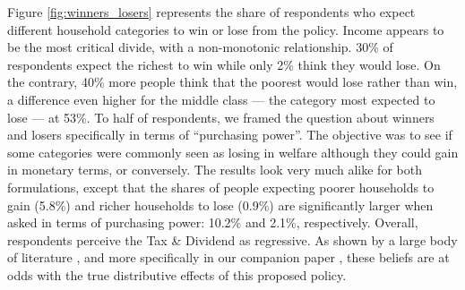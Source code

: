 \documentclass[english,5p,authoryear]{elsarticle}
\begin{document}
Figure \ref{fig:winners_losers} represents the share of respondents who expect different household categories to win or lose from the policy. Income appears to be the most critical divide, with a non-monotonic relationship. 30\% of respondents expect the richest to win while only 2\% think they would lose. On the contrary, 40\% more people think that the poorest would lose rather than win, a difference even higher for the middle class --- the category most expected to lose --- at 53\%. To half of respondents, we framed the question about winners and losers specifically in terms of ``purchasing power''. The objective was to see if some categories were commonly seen as losing in welfare although they could gain in monetary terms, or conversely. The results look very much alike for both formulations, except that the shares of people expecting poorer households to gain (5.8\%) and richer households to lose (0.9\%) are significantly larger when asked in terms of purchasing power: 10.2\% and 2.1\%, respectively. Overall, respondents perceive the Tax \& Dividend as regressive. As shown by a large body of literature \citep[e.g.][]{west_williams_04,bento_distributional_2009,williams_initial_2015}, and more specifically in our companion paper \citep{douenne_can_2019}, these beliefs are at odds with the true distributive effects of this proposed policy. %
\end{document}
